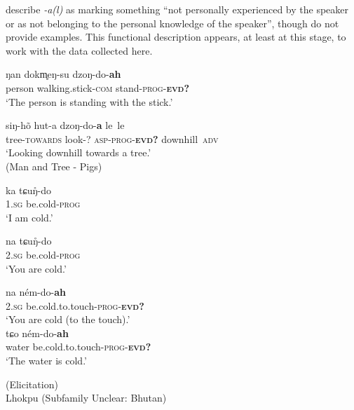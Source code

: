 \cite[20-21]{Grollmann2018} describe \textit{-a(l)} as marking something ``not personally experienced by the speaker or as not belonging to the personal knowledge of the speaker'', though do not provide examples. This functional description appears, at least at this stage, to work with the data collected here.

\begin{exe}
\ex \label{e:Methods:LhokpuVerbal}
\begin{xlist}

\ex \label{e:Methods:LhokpuVerbal:coda}
\gll ŋan dokm̥eŋ-su dzoŋ-do-\textbf{ah} \\
person walking.stick-\textsc{com} stand-\textsc{prog-\textbf{evd?}} \\
\glt `The person is standing with the stick.'

\ex \label{e:Methods:LhokpuVerbal:nocoda}
\gll siŋ-hõ hut-a dzoŋ-do-\textbf{a} le~le \\
tree-\textsc{towards} look-? \textsc{asp-prog-\textbf{evd?}} downhill~\textsc{adv} \\
\glt `Looking downhill towards a tree.' \\
(Man and Tree - Pigs)


\end{xlist}

\end{exe}

\begin{exe}
\ex \label{e:Methods:LhokpuVerbal2}
\begin{xlist}

\ex \label{e:Methods:LhokpuVerbal:cold}
\gll ka tɕuŋ̊-do \\
\textsc{1.sg} be.cold-\textsc{prog} \\
\glt `I am cold.'

\ex \label{e:Methods:LhokpuVerbal:cold2s}
\gll * na tɕuŋ̊-do \\
{} \textsc{2.sg} be.cold-\textsc{prog} \\
\glt *`You are cold.'

\ex \label{e:Methods:LhokpuVerbal:coldevid2}
\gll na ném-do-\textbf{ah} \\
\textsc{2.sg} be.cold.to.touch-\textsc{prog-\textbf{evd?}} \\
\glt `You are cold (to the touch).' \\


\ex \label{e:Methods:LhokpuVerbal:coldevid}
\gll tɕo ném-do-\textbf{ah} \\
water be.cold.to.touch-\textsc{prog-\textbf{evd?}} \\
\glt `The water is cold.' \\

\end{xlist}
(Elicitation) \\ 
Lhokpu (Subfamily Unclear: Bhutan)
\end{exe}



